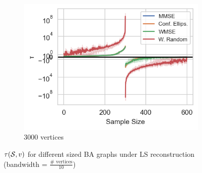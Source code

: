 \begin{figure}
\begin{subfigure}{0.3\columnwidth}
    \includegraphics[width=\columnwidth]{figures/proj1/plots/LS_threshold/BA_3_3000_bandwidth_300_thresholds_LS.png}%
    \caption{3000 vertices}%
    \label{snr_BA_3000}%
    \end{subfigure}%
    \caption{$\tau(\mathcal{S},v)$ for different sized BA graphs under LS reconstruction (bandwidth = $\frac{\# \text{ vertices}}{10}$)}
\label{LS_SNR_Threshold_plots_big_BA}
\end{figure}


